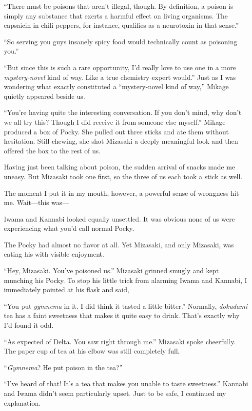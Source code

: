 \documentclass[
    a4paper,
    12pt,
    twoside,
    openany,
    UTF8,
    fontset=windows
]{ctexbook}
\begin{document}
``There must be poisons that aren't illegal, though. By definition, a poison is simply any substance that exerts a harmful effect on living organisms. The capsaicin in chili peppers, for instance, qualifies as a neurotoxin in that sense.''

``So serving you guys insanely spicy food would technically count as poisoning you.''

``But since this is such a rare opportunity, I'd really love to use one in a more \textit{mystery-novel} kind of way. Like a true chemistry expert would.''
Just as I was wondering what exactly constituted a ``mystery-novel kind of way,'' Mikage quietly appeared beside us.

``You're having quite the interesting conversation. If you don't mind, why don't we all try this? Though I did receive it from someone else myself.''
Mikage produced a box of Pocky. She pulled out three sticks and ate them without hesitation. Still chewing, she shot Mizasaki a deeply meaningful look and then offered the box to the rest of us.

Having just been talking about poison, the sudden arrival of snacks made me uneasy. But Mizasaki took one first, so the three of us each took a stick as well.

The moment I put it in my mouth, however, a powerful sense of wrongness hit me. Wait---this was---

Iwama and Kannabi looked equally unsettled. It was obvious none of us were experiencing what you'd call normal Pocky.

The Pocky had almost no flavor at all. Yet Mizasaki, and only Mizasaki, was eating his with visible enjoyment.

``Hey, Mizasaki. You've poisoned us.''
Mizasaki grinned smugly and kept munching his Pocky. To stop his little trick from alarming Iwama and Kannabi, I immediately pointed at his flask and said,

``You put \textit{gymnema} in it. I did think it tasted a little bitter.''
Normally, \textit{dokudami} tea has a faint sweetness that makes it quite easy to drink. That's exactly why I'd found it odd.

``As expected of Delta. You saw right through me.''
Mizasaki spoke cheerfully. The paper cup of tea at his elbow was still completely full.

``\textit{Gymnema}? He put poison in the tea?''

``I've heard of that! It's a tea that makes you unable to taste sweetness.''
Kannabi and Iwama didn't seem particularly upset. Just to be safe, I continued my explanation.
\end{document}
